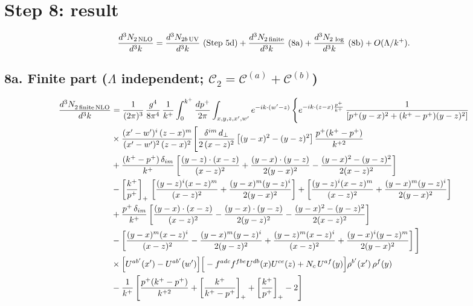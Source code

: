 \documentclass[10pt]{article}
\numberwithin{equation}{section}
\newcommand{\Wl}{\Big[U^{ab'}(x')-U^{ab'}(w')\Big]}
\begin{document}
\section{Step 8: result}
\begin{equation}
\frac{d^{3}N_{2\,\rm NLO}}{d^{3}k}=\frac{d^{3}N_{2b\,\rm UV}}{d^{3}k}\ (\text{Step 5d})+\frac{d^{3}N_{2\,\rm finite}}{d^{3}k}\ (\text{8a})+\frac{d^{3}N_{2\,\log}}{d^{3}k}\ (\text{8b})+O(\Lambda/k^{+}).
\end{equation}

\subsection*{8a. Finite part ($\Lambda$ independent; $\mathcal{C}_{2}=\mathcal{C}^{(a)}+\mathcal{C}^{(b)}$)}
\begin{align}
    \frac{d^{3}N_{2\,\rm finite\, NLO}^{\rm}}{d^{3}k} & = \frac{1}{(2\pi)^{3}}\,\frac{g^{4}}{8\pi^{4}}\,\frac{1}{k^{+}}\int_{0}^{k^{+}}\frac{dp^{+}}{2\pi}\int_{x,y,z,x',w'}e^{-ik\cdot(w'-z)}\,\Bigg\{e^{-ik\cdot(z-x)\frac{p^{+}}{k^{+}}}\,\frac{1}{\left[p^{+}(y-x)^{2}+(k^{+}-p^{+})(y-z)^{2}\right]}\notag \\ & \times\frac{(x'-w')^{i}\,(z-x)^{m}}{(x'-w')^{2}\,(z-x)^{2}}\Bigg[\frac{\delta^{im}\,d_{\perp}}{2\,(x-z)^{2}}\left[(y-x)^{2}-(y-z)^{2}\right]\frac{p^{+}(k^{+}-p^{+})}{k^{+2}}\notag\\
&+\frac{(k^{+}-p^{+})\,\delta_{im}}{k^{+}}\left[\frac{(y-z)\cdot(x-z)}{(x-z)^{2}}+\frac{(y-x)\cdot(y-z)}{2(y-x)^{2}}-\frac{(y-x)^{2}-(y-z)^{2}}{2(x-z)^{2}}\right]\notag\\
&-\left[\frac{k^{+}}{p^{+}}\right]_{+}\,\left[\frac{(y-z)^{i}(x-z)^{m}}{(x-z)^{2}}+\frac{(y-x)^{m}(y-z)^{i}}{2(y-x)^{2}}\right]+\left[\frac{(y-z)^{i}(x-z)^{m}}{(x-z)^{2}}+\frac{(y-x)^{m}(y-z)^{i}}{2(y-x)^{2}}\right]\notag\\
&+\frac{p^{+}\,\delta_{im}}{k^{+}}\left[\frac{(y-x)\cdot(x-z)}{(x-z)^{2}}-\frac{(y-x)\cdot(y-z)}{2(y-z)^{2}}-\frac{(y-x)^{2}-(y-z)^{2}}{2(x-z)^{2}}\right]\notag\\
&-\left[\frac{(y-x)^{m}(x-z)^{i}}{(x-z)^{2}}-\frac{(y-x)^{m}(y-z)^{i}}{2(y-z)^{2}}+\frac{(y-z)^{m}(x-z)^{i}}{(x-z)^{2}}+\frac{(y-x)^{i}(y-z)^{m}}{2(y-x)^{2}}\right]\Bigg]\notag\\
&\times\Wl\Big[-f^{adc}f^{fbe}U^{db}(x)U^{ce}(z)+N_{c}\,U^{af}(y)\Big]\rho^{b'}(x')\,\rho^{f}(y)\notag\\
&-\frac{1}{k^{+}}\left[\frac{p^{+}(k^{+}-p^{+})}{k^{+2}}+\left[\frac{k^{+}}{k^{+}-p^{+}}\right]_{+}+\left[\frac{k^{+}}{p^{+}}\right]_{+}-2\right]

\end{align}
\end{document}
